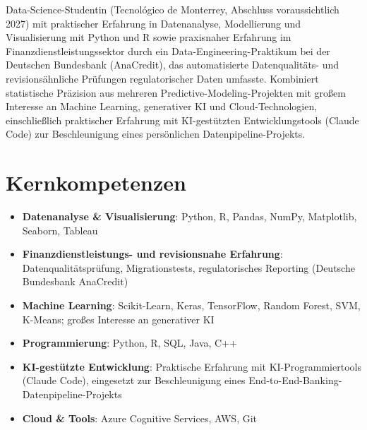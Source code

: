 \documentclass[11pt,a4paper,sans]{moderncv}
\begin{document}
\makecvtitle


\vspace{6pt}
\small{Data-Science-Studentin (Tecnológico de Monterrey, Abschluss voraussichtlich 2027) mit praktischer Erfahrung in Datenanalyse, Modellierung und Visualisierung mit Python und R sowie praxisnaher Erfahrung im Finanzdienstleistungssektor durch ein Data-Engineering-Praktikum bei der Deutschen Bundesbank (AnaCredit), das automatisierte Datenqualitäts- und revisionsähnliche Prüfungen regulatorischer Daten umfasste. Kombiniert statistische Präzision aus mehreren Predictive-Modeling-Projekten mit großem Interesse an Machine Learning, generativer KI und Cloud-Technologien, einschließlich praktischer Erfahrung mit KI-gestützten Entwicklungstools (Claude Code) zur Beschleunigung eines persönlichen Datenpipeline-Projekts.}


\section{Kernkompetenzen}
\vspace{1pt}
\begin{itemize}

\item \textbf{Datenanalyse \& Visualisierung}: Python, R, Pandas, NumPy, Matplotlib, Seaborn, Tableau

\item \textbf{Finanzdienstleistungs- und revisionsnahe Erfahrung}: Datenqualitätsprüfung, Migrationstests, regulatorisches Reporting (Deutsche Bundesbank AnaCredit)

\item \textbf{Machine Learning}: Scikit-Learn, Keras, TensorFlow, Random Forest, SVM, K-Means; großes Interesse an generativer KI

\item \textbf{Programmierung}: Python, R, SQL, Java, C++

\item \textbf{KI-gestützte Entwicklung}: Praktische Erfahrung mit KI-Programmiertools (Claude Code), eingesetzt zur Beschleunigung eines End-to-End-Banking-Datenpipeline-Projekts

\item \textbf{Cloud \& Tools}: Azure Cognitive Services, AWS, Git

\end{itemize}
\end{document}
